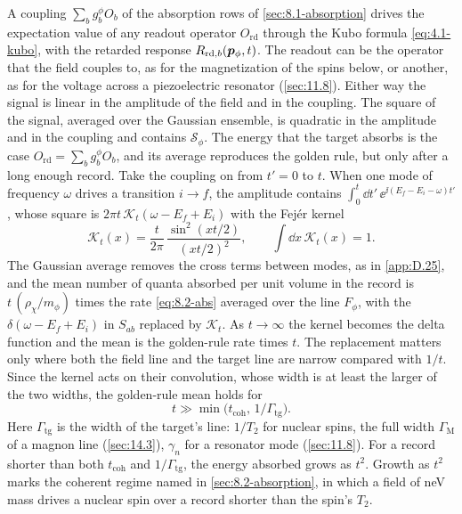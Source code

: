 A coupling $\sum_bg^\phi_bO_b$ of the absorption rows of \cref{sec:8.1-absorption} drives the expectation value of any readout operator $O_{\mathrm{rd}}$ through the Kubo formula \cref{eq:4.1-kubo}, with the retarded response $R_{\mathrm{rd},b}(\bm{p}_\phi,t)$. The readout can be the operator that the field couples to, as for the magnetization of the spins below, or another, as for the voltage across a piezoelectric resonator (\cref{sec:11.8}). Either way the signal is linear in the amplitude of the field and in the coupling. The square of the signal, averaged over the Gaussian ensemble, is quadratic in the amplitude and in the coupling and contains $\mathcal{S}_\phi$. The energy that the target absorbs is the case $O_{\mathrm{rd}} = \sum_bg^\phi_bO_b$, and its average reproduces the golden rule, but only after a long enough record. Take the coupling on from $t' = 0$ to $t$. When one mode of frequency $\omega$ drives a transition $i \to f$, the amplitude contains $\int_0^t\dd t'\,\ee^{\ii(E_f - E_i - \omega)t'}$, whose square is $2\pi t\,\mathcal{K}_t(\omega - E_f + E_i)$ with the Fejér kernel
\begin{equation}
  \mathcal{K}_t(x) = \frac{t}{2\pi}\,\frac{\sin^2(xt/2)}{(xt/2)^2}, \qquad \int\dd x\,\mathcal{K}_t(x) = 1 .
  \label{eq:14.6-fejer}
\end{equation}
The Gaussian average removes the cross terms between modes, as in \cref{app:D.25}, and the mean number of quanta absorbed per unit volume in the record is $t\,(\rho_\chi/m_\phi)$ times the rate \cref{eq:8.2-abs} averaged over the line $F_\phi$, with the $\delta(\omega - E_f + E_i)$ in $S_{ab}$ replaced by $\mathcal{K}_t$. As $t \to \infty$ the kernel becomes the delta function and the mean is the golden-rule rate times $t$. The replacement matters only where both the field line and the target line are narrow compared with $1/t$. Since the kernel acts on their convolution, whose width is at least the larger of the two widths, the golden-rule mean holds for
\begin{equation*}
  t \gg \min\bigl(t_{\mathrm{coh}},\,1/\varGamma_{\mathrm{tg}}\bigr) .
\end{equation*}
Here $\varGamma_{\mathrm{tg}}$ is the width of the target's line: $1/T_2$ for nuclear spins, the full width $\varGamma_{\mathrm{M}}$ of a magnon line (\cref{sec:14.3}), $\gamma_n$ for a resonator mode (\cref{sec:11.8}). For a record shorter than both $t_{\mathrm{coh}}$ and $1/\varGamma_{\mathrm{tg}}$, the energy absorbed grows as $t^2$. Growth as $t^2$ marks the coherent regime named in \cref{sec:8.2-absorption}, in which a field of neV mass drives a nuclear spin over a record shorter than the spin's $T_2$.

